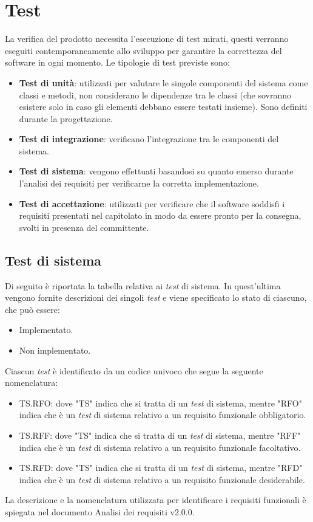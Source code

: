 \section{Test}
La verifica del prodotto necessita l'esecuzione di test mirati, questi verranno eseguiti contemporaneamente allo sviluppo per garantire la correttezza del software in ogni momento.
Le tipologie di test previste sono:
\begin{itemize}
    \item \textbf{Test di unità}: utilizzati per valutare le singole componenti del sistema come classi e metodi, non considerano le dipendenze tra le classi (che sovranno esistere solo in caso gli elementi debbano essere testati insieme).
    Sono definiti durante la progettazione.
    \item \textbf{Test di integrazione}: verificano l'integrazione tra le componenti del sistema.
    \item \textbf{Test di sistema}: vengono effettuati basandosi su quanto emerso durante l'analisi dei requisiti per verificarne la corretta implementazione.
    \item \textbf{Test di accettazione}: utilizzati per verificare che il software soddisfi i requisiti presentati nel capitolato in modo da essere pronto per la consegna, svolti in presenza del committente.    
\end{itemize}

\subsection{Test di sistema}
Di seguito è riportata la tabella relativa ai \textit{test} di sistema. In quest'ultima vengono fornite descrizioni 
dei singoli \textit{test} e viene specificato lo stato di ciascuno, che può essere:
\begin{itemize}
    \item Implementato.
    \item Non implementato.
\end{itemize}
Ciascun \textit{test} è identificato da un codice univoco che segue la seguente nomenclatura:
\begin{itemize}
    \item TS.RFO: dove "TS" indica che si tratta di un \textit{test} di sistema, mentre "RFO" indica che è un \textit{test} di sistema relativo a un requisito funzionale obbligatorio.
    \item TS.RFF: dove "TS" indica che si tratta di un \textit{test} di sistema, mentre "RFF" indica che è un \textit{test} di sistema relativo a un requisito funzionale facoltativo.
    \item TS.RFD: dove "TS" indica che si tratta di un \textit{test} di sistema, mentre "RFD" indica che è un \textit{test} di sistema relativo a un requisito funzionale desiderabile.
\end{itemize}
La descrizione e la nomenclatura utilizzata per identificare i requisiti funzionali è spiegata nel documento Analisi dei requisiti v2.0.0.

